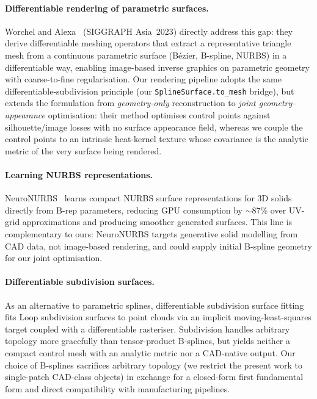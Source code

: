 \paragraph{Differentiable rendering of parametric surfaces.}
Worchel and Alexa~\cite{worchelalexa2023} (SIGGRAPH Asia~2023) directly address
this gap: they derive differentiable meshing operators that extract a
representative triangle mesh from a continuous parametric surface
(B\'ezier, B-spline, NURBS) in a differentiable way, enabling image-based
inverse graphics on parametric geometry with coarse-to-fine regularisation.
Our rendering pipeline adopts the same differentiable-subdivision principle
(our \texttt{SplineSurface.to\_mesh} bridge), but extends the formulation from
\emph{geometry-only} reconstruction to \emph{joint geometry--appearance}
optimisation: their method optimises control points against silhouette/image
losses with no surface appearance field, whereas we couple the control points
to an intrinsic heat-kernel texture whose covariance is the analytic metric of
the very surface being rendered.

\paragraph{Learning NURBS representations.}
NeuroNURBS~\cite{neuronurbs} learns compact NURBS surface representations for
3D solids directly from B-rep parameters, reducing GPU consumption by
\ensuremath{\sim}87\% over UV-grid approximations and producing smoother
generated surfaces. This line is complementary to ours: NeuroNURBS targets
generative solid modelling from CAD data, not image-based rendering, and could
supply initial B-spline geometry for our joint optimisation.

\paragraph{Differentiable subdivision surfaces.}
As an alternative to parametric splines, differentiable subdivision surface
fitting~\cite{diffsubsurf} fits Loop subdivision surfaces to point clouds via
an implicit moving-least-squares target coupled with a differentiable
rasteriser. Subdivision handles arbitrary topology more gracefully than
tensor-product B-splines, but yields neither a compact control mesh with an
analytic metric nor a CAD-native output. Our choice of B-splines sacrifices
arbitrary topology (we restrict the present work to single-patch CAD-class
objects) in exchange for a closed-form first fundamental form and direct
compatibility with manufacturing pipelines.

